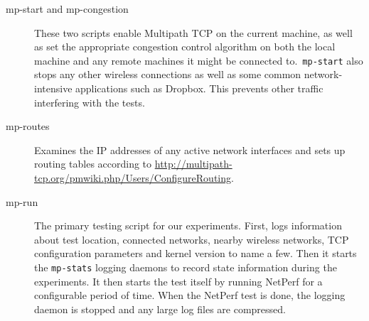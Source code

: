 \begin{description}
  \item[mp-start and mp-congestion]
    These two scripts enable Multipath TCP on the current machine, as well as
    set the appropriate congestion control algorithm on both the local machine
    and any remote machines it might be connected to.\ \texttt{mp-start} also
    stops any other wireless connections as well as some common
    network-intensive applications such as Dropbox. This prevents other traffic
    interfering with the tests.
  \item[mp-routes]
    Examines the IP addresses of any active network interfaces and sets up
    routing tables according to
    \href{http://multipath-tcp.org/pmwiki.php/Users/ConfigureRouting}{http://multipath-tcp.org/\-pmwiki.php/\-Users/\-ConfigureRouting}.
  \item[mp-run]
    The primary testing script for our experiments. First, logs information
    about test location, connected networks, nearby wireless networks, TCP
    configuration parameters and kernel version to name a few. Then it starts
    the \texttt{mp-stats} logging daemons to record state information during the
    experiments. It then starts the test itself by running NetPerf for a
    configurable period of time. When the NetPerf test is done, the logging
    daemon is stopped and any large log files are compressed.


\end{description}
